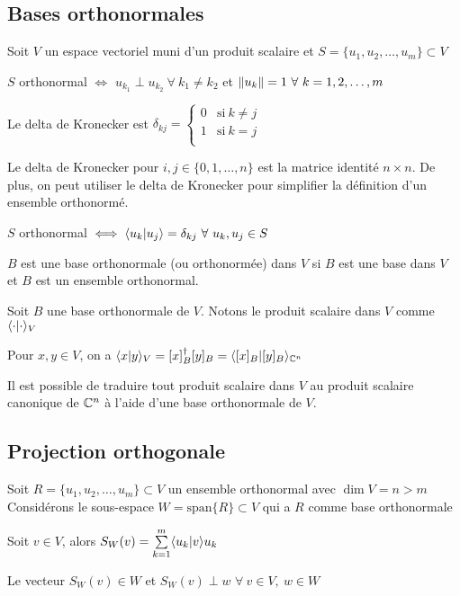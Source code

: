\subsection{Bases orthonormales}
Soit $V$ un espace vectoriel muni d'un produit scalaire et $S = \{u_1, u_2, \dots, u_m\} \subset V$
\begin{definition}
      $S$ orthonormal $\iff$
      $u_{k_1} \perp u_{k_2} \ \forall \ k_1 \neq k_2$ et $\left\lVert u_k\right\rVert = 1 \ \forall \ k = 1, 2, \dots, m$ 
\end{definition}
\begin{definition}
      Le delta de Kronecker est $\delta_{kj} = \begin{cases}
            0 & \text{si} \ k \neq j \\
            1 & \text{si} \ k = j \\
      \end{cases}$
\end{definition}
\begin{remark}
      Le delta de Kronecker pour $i, j \in \{0, 1, \dots, n\}$ est la matrice identité $n \times n$.
      De plus, on peut utiliser le delta de Kronecker pour simplifier la définition d'un ensemble orthonormé.
\end{remark}
\begin{definition}
      $S$ orthonormal $\iff \langle u_k \lvert u_j \rangle = \delta_{kj} \ \forall \ u_k, u_j \in S$ 
\end{definition}
\begin{definition}
      $B$ est une base orthonormale (ou orthonormée) dans $V$ si $B$ est une base dans $V$ et 
      $B$ est un ensemble orthonormal.
\end{definition}
Soit $B$ une base orthonormale de $V$. Notons le produit scalaire dans $V$ comme $\langle \cdot \lvert \cdot \rangle_V$
\begin{theorem}
      Pour $x, y \in V$, on a $\langle x \lvert y \rangle_V = [x]_B^\dagger [y]_B = \langle [x]_B \lvert [y]_B \rangle_{\mathbb{C}^n}$
\end{theorem}
\begin{remark}
      Il est possible de traduire tout produit scalaire dans $V$ au produit scalaire canonique de
      $\mathbb{C}^n$ à l'aide d'une base orthonormale de $V$.
\end{remark}

\subsection{Projection orthogonale}
Soit $R = \{u_1, u_2, \dots, u_m\} \subset V$ un ensemble orthonormal avec $\dim V = n > m$ \\
Considérons le sous-espace $W = \text{span}\{R\} \subset V$ qui a $R$ comme base orthonormale
\begin{definition}
      Soit $v \in V$, alors $S_W(v) = \sum\limits_{k = 1}^{m}\langle u_k \lvert v \rangle{u_k}$
\end{definition}
\begin{theorem}
      Le vecteur $S_W(v) \in W$ et $S_W(v) \perp w$ $\forall \ v \in V, \ w \in W$
\end{theorem}

